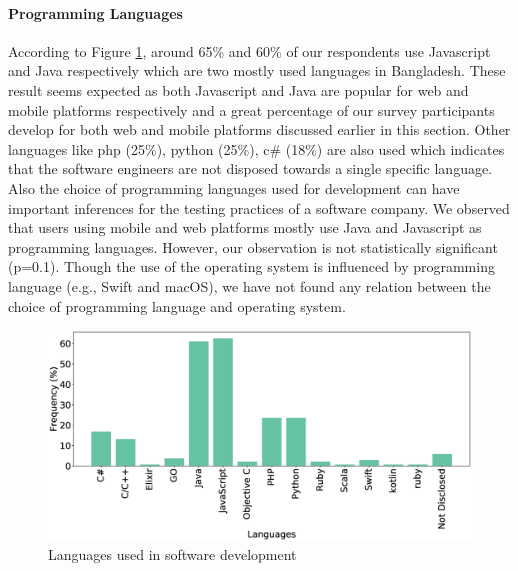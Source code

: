 \paragraph{Programming Languages}
According to Figure \ref{fig:languages}, around 65\% and 60\% of our respondents use Javascript and Java respectively which are two mostly used languages in Bangladesh. These result seems expected as both Javascript and Java are popular for web and mobile platforms respectively and a great percentage of our survey participants develop for both web and mobile platforms discussed earlier in this section. Other languages like php (25\%), python (25\%), c\# (18\%) are also used which indicates that the software engineers are not disposed towards a single specific language. Also the choice of programming languages used for development can have important inferences for the testing practices of a software company. We observed that users using mobile and web platforms mostly use Java and Javascript as programming languages. However, our observation is not statistically significant (p=0.1). Though the use of the operating system is influenced by programming language (e.g., Swift and macOS), we have not found any relation between the choice of programming language and operating system.

\begin{figure}[h]
\centering
  \includegraphics[scale=0.18]{Figures/Respondents_languages}
  \caption{Languages used in software development}
  \label{fig:languages}
\end{figure}

